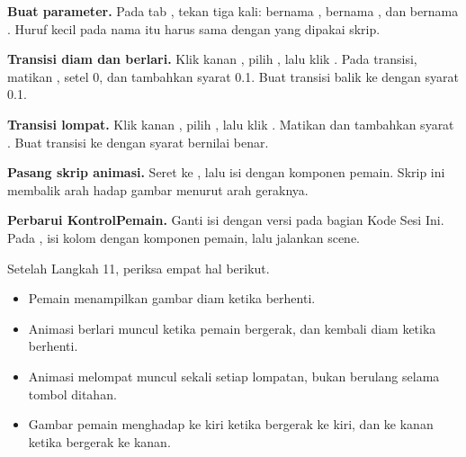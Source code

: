 \begin{langkah}
  \item \textbf{Buat parameter.} Pada tab , tekan \menu{+}
        tiga kali:  bernama ,  bernama
        , dan  bernama . Huruf
        kecil pada nama itu harus sama dengan yang dipakai skrip.

  \item \textbf{Transisi diam dan berlari.} Klik kanan , pilih
        , lalu klik . Pada
         transisi, matikan , setel
         0, dan tambahkan syarat
          0.1. Buat transisi balik
         ke  dengan syarat   0.1.

  \item \textbf{Transisi lompat.} Klik kanan , pilih
        , lalu klik . Matikan
         dan tambahkan syarat . Buat
        transisi  ke  dengan syarat
         bernilai benar.

  \item \textbf{Pasang skrip animasi.} Seret  ke
        , lalu isi  dengan komponen
         pemain. Skrip ini membalik arah hadap gambar
        menurut arah geraknya.

  \item \textbf{Perbarui KontrolPemain.} Ganti isi
         dengan versi pada bagian Kode Sesi
        Ini. Pada , isi kolom  dengan komponen
         pemain, lalu jalankan scene.
\end{langkah}

\begin{ujibox}
Setelah Langkah 11, periksa empat hal berikut.
\begin{itemize}[leftmargin=1.4em, itemsep=0.2em]
  \item Pemain menampilkan gambar diam ketika berhenti.
  \item Animasi berlari muncul ketika pemain bergerak, dan kembali diam ketika
        berhenti.
  \item Animasi melompat muncul sekali setiap lompatan, bukan berulang selama
        tombol ditahan.
  \item Gambar pemain menghadap ke kiri ketika bergerak ke kiri, dan ke kanan
        ketika bergerak ke kanan.
\end{itemize}
\end{ujibox}

